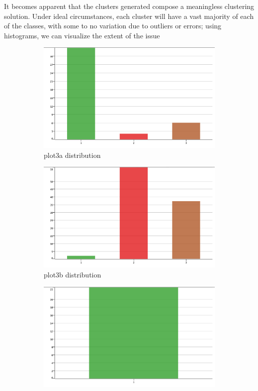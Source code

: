 \documentclass[11pt]{article}
\begin{document}
		 	\fi
			It becomes apparent that the clusters generated compose a meaningless clustering solution. Under ideal circumstances, each cluster will have a vast majority of each of the classes, with some to no variation due to outliers or errors; using histograms, we can visualize the extent of the issue 
			\iffalse
			\begin{figure}[H]
				\centering
				\begin{subfigure}{0.4\textwidth}
			 		\includegraphics[width=\textwidth]{res/t1/t14/t14-plota-dist}
					\caption{plot3a distribution}
					\label{fig:first}
				\end{subfigure}
				\hfill
				\begin{subfigure}{0.4\textwidth}
			 		\includegraphics[width=\textwidth]{res/t1/t14/t14-plotb-dist}
					\caption{plot3b distribution}
					\label{fig:second}
				\end{subfigure}
				\hfill
				\begin{subfigure}{0.4\textwidth}
			 		\includegraphics[width=\textwidth]{res/t1/t14/t14-plotc-dist}

\end{subfigure}
\end{figure}
\end{document}
